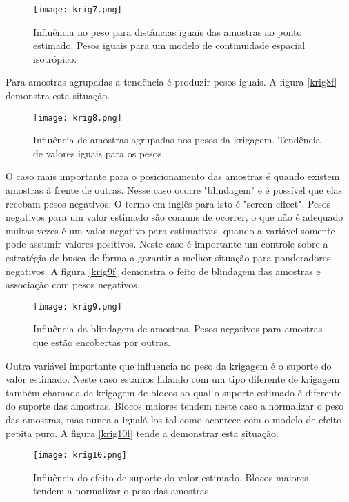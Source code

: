 \begin{figure}[H]
	\centering
	\texttt{[image: krig7.png]}
	\caption{Influência no peso para distâncias iguais das amostras ao ponto estimado. Pesos iguais para um modelo de continuidade espacial isotrópico.}
	\label{krig7f}
\end{figure}

Para amostras agrupadas a tendência é produzir pesos iguais. A figura \eqref{krig8f} demonstra esta situação.

\begin{figure}[H]
	\centering
	\texttt{[image: krig8.png]}
	\caption{Influência de amostras agrupadas nos pesos da krigagem. Tendência de valores iguais para os pesos. }
	\label{krig8f}
\end{figure}

O caso mais importante para o posicionamento das amostras é quando existem amostras à frente de outras. Nesse caso ocorre "blindagem" e é possível que elas recebam pesos negativos. O termo em inglês para isto é "screen effect". Pesos negativos para um valor estimado são comuns de ocorrer, o que não é adequado muitas vezes é um valor negativo para estimativas, quando a variável somente pode assumir valores positivos. Neste caso é importante um controle sobre a estratégia de busca de forma a garantir a melhor situação para ponderadores negativos. A figura \eqref{krig9f} demonstra o feito de blindagem das amostras e associação com pesos negativos. 

\begin{figure}[H]
	\centering
	\texttt{[image: krig9.png]}
	\caption{Influência da blindagem de amostras. Pesos negativos para amostras que estão encobertas por outras. }
	\label{krig9f}
\end{figure}
 
Outra variável importante que influencia no peso da krigagem é o suporte do valor estimado. Neste caso estamos lidando com um tipo diferente de krigagem também chamada de krigagem de blocos ao qual o suporte estimado é diferente do suporte das amostras. Blocos maiores tendem neste caso a normalizar o peso das amostras, mas nunca a igualá-los tal como acontece com o modelo de efeito pepita puro. A figura \eqref{krig10f} tende a demonstrar esta situação. 

\begin{figure}[H]
	\centering
	\texttt{[image: krig10.png]}
	\caption{Influência do efeito de suporte do valor estimado. Blocos maiores tendem a normalizar o peso das amostras.  }
	\label{krig10f}
\end{figure}


